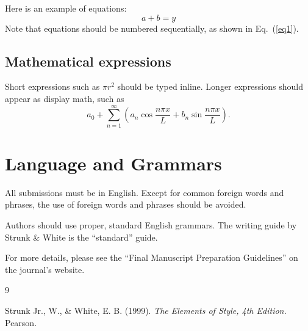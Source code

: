 \documentclass[12pt]{article}
\begin{document}
Here is an example of equations:
\begin{equation}
a+b = y \label{eq1}
\end{equation}
Note that equations should be numbered sequentially, as shown in Eq.~(\ref{eq1}).

\subsection{Mathematical expressions}

Short expressions such as $\pi r^2$ should be typed inline. Longer expressions should appear as display math, such as
\[
a_0 + \sum_{n=1}^\infty \left( 
a_n \cos{\frac{n \pi x}{L}} + b_n \sin{\frac{n \pi x}{L}}
\right) .
\]

\section{Language and Grammars}

All submissions must be in English. Except for common foreign words and phrases, the use of foreign words and phrases should be avoided.

Authors should use proper, standard English grammars. The writing guide by Strunk \& White \cite{SW99} is the ``standard'' guide.

For more details, please see the ``Final Manuscript Preparation Guidelines'' on the journal's website.

\begin{thebibliography}{9}

 Strunk Jr., W., \& White, E. B. (1999). {\it The Elements of Style, 4th Edition.} Pearson.

\end{thebibliography}
\end{document}

